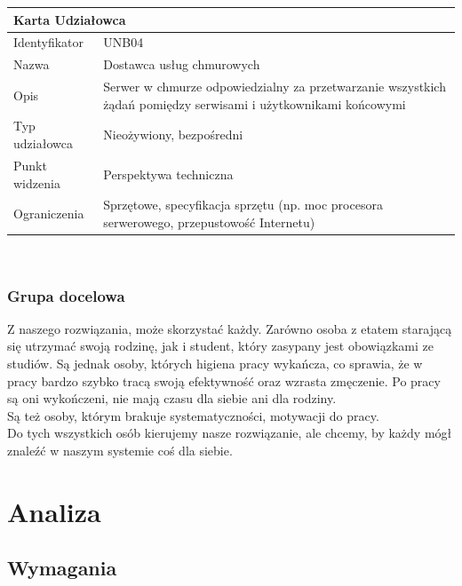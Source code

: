 \documentclass[a4paper,11pt]{report}
\begin{document}
	\newline
	\vspace{0.2cm}
	\newline
	\begin{tabular}{|p{3cm}|p{11cm}|}
	\hline
	\multicolumn{2}{|l|}{\textbf{Karta Udziałowca}}\\
	\hline
	Identyfikator&UNB04\\
	\hline
	Nazwa&Dostawca usług chmurowych\\
	\hline
	Opis&Serwer w chmurze odpowiedzialny za przetwarzanie wszystkich żądań pomiędzy serwisami i użytkownikami końcowymi\\
	\hline
	Typ udziałowca&Nieożywiony, bezpośredni\\
	\hline
	Punkt widzenia&Perspektywa techniczna\\
	\hline
	Ograniczenia& Sprzętowe, specyfikacja sprzętu (np. moc procesora serwerowego, przepustowość Internetu)\\
	\hline
	\end{tabular}\\
\subsection {Grupa docelowa}
Z naszego rozwiązania, może skorzystać każdy.
Zarówno osoba z etatem starającą się utrzymać swoją rodzinę, jak i student, który zasypany jest obowiązkami ze studiów.
Są jednak osoby, których higiena pracy wykańcza, co sprawia, że w pracy bardzo szybko tracą swoją efektywność oraz wzrasta zmęczenie.
Po pracy są oni wykończeni, nie mają czasu dla siebie ani dla rodziny.\\
Są też osoby, którym brakuje systematyczności, motywacji do pracy.\\
Do tych wszystkich osób kierujemy nasze rozwiązanie, ale chcemy, by każdy mógł znaleźć w naszym systemie coś dla siebie.\\
\chapter {Analiza}
\section {Wymagania}
\end{document}
